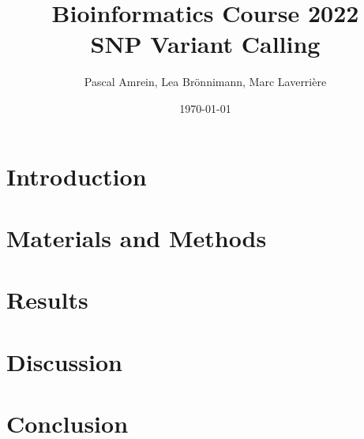 \documentclass{article}
\title{Bioinformatics Course 2022\\ \textbf{SNP Variant Calling}} %
\author{Pascal Amrein, Lea Brönnimann, Marc Laverrière}
\date{\today}
\begin{document}
\maketitle


\renewcommand{\abstractname}{Abstract}
\begin{abstract}
    
\end{abstract}


\section{Introduction}
\citep{Pillet2022}

\section{Materials and Methods}



\section{Results}

\section{Discussion}

\section{Conclusion}




\end{document}
